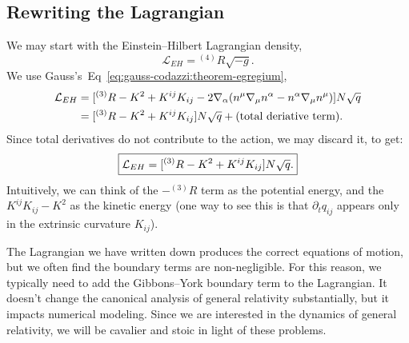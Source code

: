 \subsection{Rewriting the Lagrangian}

We may start with the Einstein--Hilbert Lagrangian density,
\begin{equation}
\mathcal{L}_{EH} = {}^{(4)}R\sqrt{-g}.
\end{equation}
We use Gauss's~Eq~\eqref{eq:gauss-codazzi:theorem-egregium},
\begin{equation}
  \begin{split}
\mathcal{L}_{EH} &= [{}^{(3)}R - K^{2} + K^{ij}K_{ij}-2\nabla_{\alpha}(n^{\mu}\nabla_{\mu}n^{\alpha}-n^{\alpha}\nabla_{\mu}n^{\mu})]N\sqrt{q}\\
&= [{}^{(3)}R - K^{2} + K^{ij}K_{ij}]N\sqrt{q}+(\mbox{total deriative term}).
\end{split}
\end{equation}
Since total derivatives do not contribute to the action, we may discard
it, to get:
\begin{equation}
\boxed{\mathcal{L}_{EH}= [{}^{(3)}R - K^{2} + K^{ij}K_{ij}]N\sqrt{q}.}
\end{equation}
Intuitively, we can think of the $-{}^{(3)}R$ term as the potential
energy, and the $K^{ij}K_{ij}-K^{2}$ as the kinetic energy (one way to
see this is that $\partial_{t}q_{ij}$ appears only in the extrinsic
curvature $K_{ij}$).

\begin{danger}
The Lagrangian we have written down produces the correct equations of
motion, but we often find the boundary terms are non-negligible. For
this reason, we typically need to add the Gibbons--York boundary term to
the Lagrangian. It doesn't change the canonical analysis of general
relativity substantially, but it impacts numerical modeling. Since we
are interested in the dynamics of general relativity, we will be
cavalier and stoic in light of these problems.
\end{danger}